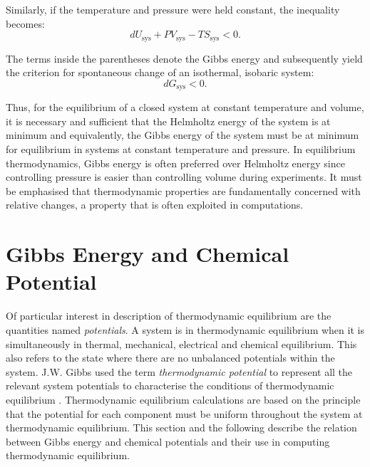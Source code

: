     Similarly, if the temperature and pressure were held constant, the inequality becomes:
    \begin{equation}
        d{U_\text{sys} + PV_\text{sys} - TS_\text{sys} } < 0.
    \end{equation}

    The terms inside the parentheses denote the Gibbs energy and subsequently yield the criterion for spontaneous change of an isothermal, isobaric system:
    \begin{equation}
        d{G_\text{sys} } < 0.
    \end{equation}

    Thus, for the equilibrium of a closed system at constant temperature and volume, it is necessary and sufficient that the Helmholtz energy of the system is at minimum and equivalently, the Gibbs energy of the system must be at minimum for equilibrium in systems at constant temperature and pressure. In equilibrium thermodynamics, Gibbs energy is often preferred over Helmholtz energy since controlling pressure is easier than controlling volume during experiments. It must be emphasised that thermodynamic properties are fundamentally concerned with relative changes, a property that is often exploited in computations.

\section{Gibbs Energy and Chemical Potential}
    Of particular interest in description of  thermodynamic equilibrium are the quantities named \emph{potentials}. A system is in thermodynamic equilibrium when it is simultaneously in thermal, mechanical, electrical and chemical equilibrium. This also refers to the state where there are no unbalanced potentials within the system. J.W. Gibbs used the term \emph{thermodynamic potential} to represent all the relevant system potentials to characterise the conditions of thermodynamic equilibrium \cite{Gibbs:1878aa}. Thermodynamic equilibrium calculations are based on the principle that the potential for each component must be uniform throughout the system at thermodynamic equilibrium. This section and the following describe the relation between Gibbs energy and chemical potentials and their use in computing thermodynamic equilibrium.

